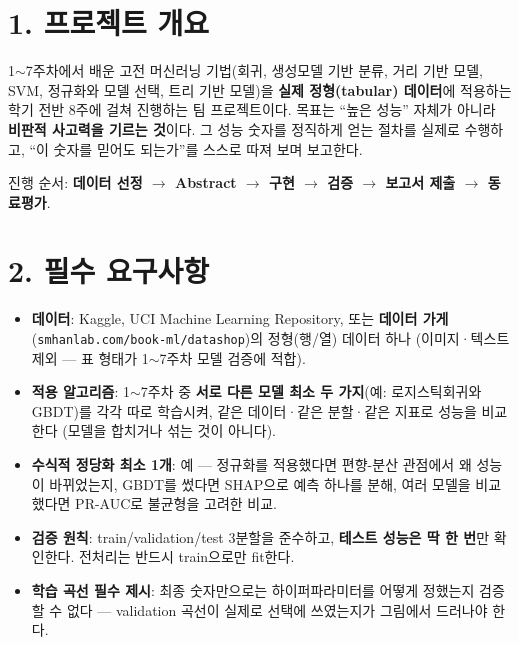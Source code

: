 \documentclass[12pt]{article}
\begin{document}

\section*{1. 프로젝트 개요}
1$\sim$7주차에서 배운 고전 머신러닝 기법(회귀, 생성모델 기반
분류, 거리 기반 모델, SVM, 정규화와 모델 선택, 트리 기반 모델)을
\textbf{실제 정형(tabular) 데이터}에 적용하는 학기 전반 8주에 걸쳐 진행하는 팀
프로젝트이다. 목표는 ``높은 성능'' 자체가 아니라 \textbf{비판적 사고력을
기르는 것}이다. 그 성능 숫자를 정직하게 얻는 절차를 실제로 수행하고,
``이 숫자를 믿어도 되는가''를 스스로 따져 보며 보고한다.

\vspace{4pt}
\noindent 진행 순서: \textbf{데이터 선정 $\to$ Abstract $\to$ 구현 $\to$
검증 $\to$ 보고서 제출 $\to$ 동료평가}.

\section*{2. 필수 요구사항}
\begin{itemize}
\item \textbf{데이터}: Kaggle, UCI Machine Learning Repository, 또는
  \textbf{데이터 가게}(\texttt{smhanlab.com/book-ml/datashop})의
  정형(행/열) 데이터 하나 (이미지·텍스트 제외 --- 표 형태가
  1$\sim$7주차 모델 검증에 적합).
\item \textbf{적용 알고리즘}: 1$\sim$7주차 중 \textbf{서로 다른 모델
  최소 두 가지}(예: 로지스틱회귀와 GBDT)를 각각 따로 학습시켜, 같은
  데이터·같은 분할·같은 지표로 성능을 비교한다 (모델을 합치거나 섞는 것이
  아니다).
\item \textbf{수식적 정당화 최소 1개}: 예 --- 정규화를 적용했다면
  편향-분산 관점에서 왜 성능이 바뀌었는지, GBDT를 썼다면 SHAP으로
  예측 하나를 분해, 여러 모델을 비교했다면 PR-AUC로 불균형을 고려한
  비교.
\item \textbf{검증 원칙}: train/validation/test 3분할을 준수하고,
  \textbf{테스트 성능은 딱 한 번}만 확인한다. 전처리는 반드시
  train으로만 fit한다.
\item \textbf{학습 곡선 필수 제시}: 최종 숫자만으로는 하이퍼파라미터를
  어떻게 정했는지 검증할 수 없다 --- validation 곡선이 실제로
  선택에 쓰였는지가 그림에서 드러나야 한다.
\end{itemize}

\newpage
\end{document}
